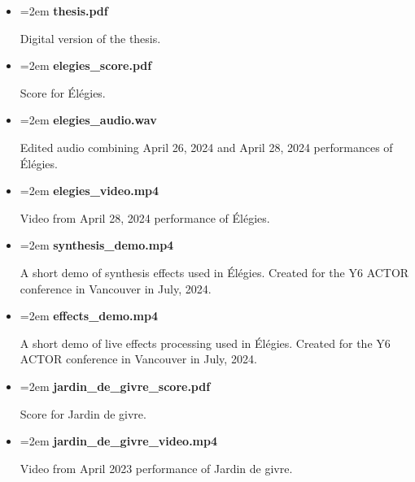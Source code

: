 \documentclass[12pt,twoside,maitrise]{dms_ks}
\theoremstyle{definition}
\begin{document}
\begin{itemize}
    \setlength\itemsep{0.5em}  %
    \setlength\parskip{0pt}    %
    \setlength\parsep{0pt}
    \setlength\leftskip{0pt}   %
    \setlength{\labelsep}{0pt} %
    \renewcommand{\labelitemi}{} %
    \renewcommand{\labelitemii}{} %

    \item \hangindent=2em \textbf{thesis.pdf}
    \par Digital version of the thesis.
     
    \item \hangindent=2em \textbf{elegies\_score.pdf}
    \par Score for Élégies.
    
    \item \hangindent=2em \textbf{elegies\_audio.wav}
    \par Edited audio combining April 26, 2024 and April 28, 2024 performances of Élégies.
    
    \item \hangindent=2em \textbf{elegies\_video.mp4}
    \par Video from April 28, 2024 performance of Élégies.
    
    \item \hangindent=2em \textbf{synthesis\_demo.mp4}
    \par A short demo of synthesis effects used in Élégies. Created for the Y6 ACTOR conference in Vancouver in July, 2024.
    
    \item \hangindent=2em \textbf{effects\_demo.mp4}
    \par A short demo of live effects processing used in Élégies. Created for the Y6 ACTOR conference in Vancouver in July, 2024.

    \item \hangindent=2em \textbf{jardin\_de\_givre\_score.pdf}
    \par Score for Jardin de givre.
    
    \item \hangindent=2em \textbf{jardin\_de\_givre\_video.mp4}
    \par Video from April 2023 performance of Jardin de givre.
\end{itemize}

\end{document}
